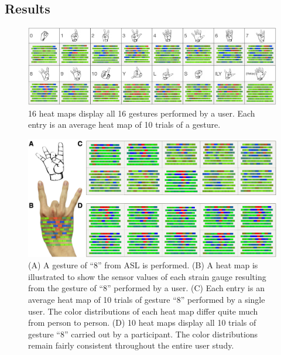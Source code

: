 \documentclass{sigchi}
\begin{document}
\subsection{Results}

\begin{figure}
 \begin{center}
  \includegraphics[width=2\columnwidth]{figures/user16GesturesSV.pdf}
  \caption{ 16 heat maps display all 16 gestures performed by a user. Each entry is an average heat map of 10 trials of a gesture.
  }
  \label{fig:user16GesturesSV}
  \end{center}
\end{figure}

\begin{figure}
 \begin{center}
  \includegraphics[width=2\columnwidth]{figures/SVisual_v2.pdf}
  \caption{
    (A) A gesture of ``8'' from ASL is performed.
    (B) A heat map is illustrated to show the sensor values of each strain gauge resulting from the gesture of ``8'' performed by a user. 
    (C) Each entry is an average heat map of 10 trials of gesture ``8'' performed by a single user. The color distributions of each heat map differ quite much from person to person.
    (D) 10 heat maps display all 10 trials of gesture ``8'' carried out by a participant. The color distributions remain fairly consistent throughout the entire user study.
  }
  \label{fig:SVisual}
  \end{center}
\end{figure}
\end{document}
